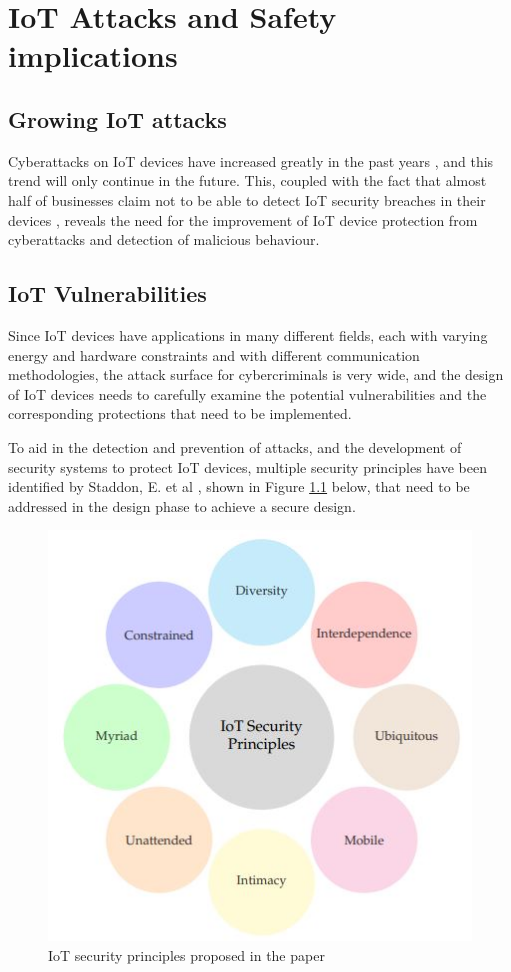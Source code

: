 \chapter{IoT Attacks and Safety implications}

\section{Growing IoT attacks}
Cyberattacks on IoT devices have increased greatly in the past years \cite{forbes}, and this trend will only continue in the future. This, coupled with the fact that almost half of businesses claim not to be able to detect IoT security breaches in their devices \cite{gemalto}, reveals the need for the improvement of IoT device protection from cyberattacks and detection of malicious behaviour.\\

\section{IoT Vulnerabilities}
Since IoT devices have applications in many different fields, each with varying energy and hardware constraints and with different communication methodologies, the attack surface for cybercriminals is very wide, and the design of IoT devices needs to carefully examine the potential vulnerabilities and the corresponding protections that need to be implemented.
    
To aid in the detection and prevention of attacks, and the development of security systems to protect IoT devices, multiple security principles have been identified by Staddon, E. et al \cite{IoT_categorization}, shown in Figure \ref{fig:security_principles} below, that need to be addressed in the design phase to achieve a secure design.\\

\begin{figure}[h]
    \centering
    \includegraphics[width=.9\linewidth]{images/IoT security principles.JPG}
    \caption{IoT security principles proposed in the paper}
    \label{fig:security_principles}
\end{figure}

